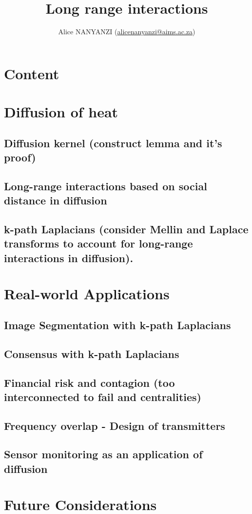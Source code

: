 \documentclass[10pt,a4paper]{article}
\author{Alice NANYANZI (\href{mailto:alicenanyanzi@aims.ac.za}{alicenanyanzi@aims.ac.za})}
\title{Long range interactions}
\begin{document}
\maketitle
\section*{Content}
\section{Diffusion of heat}
	\subsection{ Diffusion kernel (construct lemma and it's proof)}
	\subsection{Long-range interactions based on social distance in diffusion}
	\subsection{k-path Laplacians (consider Mellin and Laplace transforms to account for long-range interactions in diffusion).}
\section{Real-world Applications }
\subsection{Image Segmentation with k-path Laplacians}
\subsection{Consensus with k-path Laplacians}
\subsection{Financial risk and contagion (too interconnected to fail and centralities)}
\subsection{Frequency overlap - Design of transmitters}
\subsection{Sensor monitoring as an application of diffusion}
\section{Future Considerations}
\end{document}
